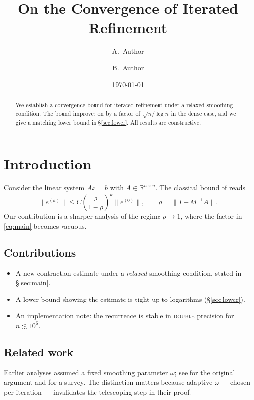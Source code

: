 \documentclass[11pt]{article}
\title{On the Convergence of Iterated Refinement}
\author{A.\ Author \and B.\ Author}
\date{\today}
\begin{document}
\maketitle

\begin{abstract}
We establish a convergence bound for iterated refinement under a relaxed
smoothing condition. The bound improves on \cite{klass} by a factor of
$\sqrt{n/\log n}$ in the dense case, and we give a matching lower bound
in \S\ref{sec:lower}. All results are constructive.
\end{abstract}

\section{Introduction}\label{sec:intro}

Consider the linear system $Ax = b$ with $A \in \mathbb{R}^{n \times n}$.
The classical bound of \cite{klass} reads
\begin{equation}\label{eq:main}
  \lVert e^{(k)} \rVert \leq C \left( \frac{\rho}{1 - \rho} \right)^{k}
  \lVert e^{(0)} \rVert, \qquad \rho = \lVert I - M^{-1}A \rVert .
\end{equation}
Our contribution is a sharper analysis of the regime $\rho \to 1$, where
the factor in \eqref{eq:main} becomes vacuous.

\subsection{Contributions}\label{sec:contrib}

\begin{itemize}
  \item A new contraction estimate under a \emph{relaxed} smoothing
    condition, stated in \S\ref{sec:main}.
  \item A lower bound showing the estimate is tight up to logarithms
    (\S\ref{sec:lower}).
  \item An implementation note: the recurrence is stable in
    \textsc{double} precision for $n \lesssim 10^{6}$.
\end{itemize}

\subsection{Related work}

Earlier analyses assumed a fixed smoothing parameter $\omega$; see
\citet{klass} for the original argument and \cite{other,more} for a
survey. The distinction matters because adaptive $\omega$ --- chosen per
iteration --- invalidates the telescoping step in their proof.
\end{document}
